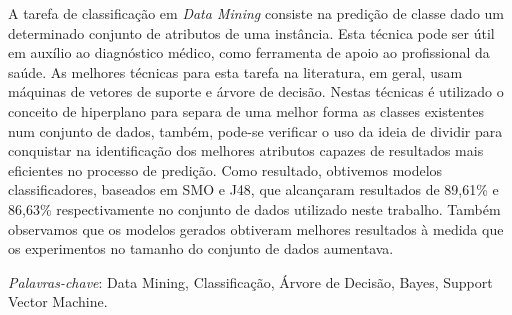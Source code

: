 \documentclass[
	12pt,				%
	openright,			%
	oneside,	
	a4paper,				%
	english,				%
	brazil				%
]{abntex2/abntex2} %
\begin{document}













\setlength{\absparsep}{18pt} %
\begin{resumo}

 	A tarefa de classificação em \textit{Data Mining} consiste na predição de classe dado um determinado conjunto de atributos de uma instância. Esta técnica pode ser útil em auxílio ao diagnóstico médico, como ferramenta de apoio ao profissional da saúde. As melhores técnicas para esta tarefa na literatura, em geral, usam máquinas de vetores de suporte e árvore de decisão. Nestas técnicas é utilizado o conceito de hiperplano para separa de uma melhor forma as classes existentes num conjunto de dados, também, pode-se verificar o uso da ideia de dividir para conquistar na identificação dos melhores atributos capazes de resultados mais eficientes no processo de predição. Como resultado, obtivemos modelos classificadores, baseados em SMO e J48, que alcançaram resultados de 89,61\% e 86,63\% respectivamente no conjunto de dados utilizado neste trabalho. Também observamos que os modelos gerados obtiveram melhores resultados à medida que os experimentos no tamanho do conjunto de dados aumentava.

 \textit{Palavras-chave}: Data Mining, Classificação, Árvore de Decisão, Bayes, Support Vector Machine.

\end{resumo}
\end{document}
